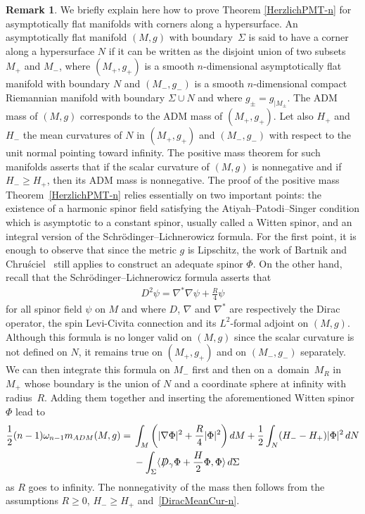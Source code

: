 \documentclass[10pt,a4paper]{article}
\numberwithin{equation}{section}
\theoremstyle{definition}
\newtheorem{Remark}[Theorem]{Remark}
\def\D{D\!\!\!\!/\,}
\begin{document}
\begin{Remark}\label{SpinBoundaryCorner}
We briefly explain here how to prove Theorem \ref{HerzlichPMT-n} for asymptotically flat manifolds with corners along a hypersurface. An asymptotically flat manifold $(M,g)$ with boundary~$\Sigma$ is said to have a corner along a hypersurface $N$ if it can be written as the disjoint union of two subsets $M_+$ and $M_-$, where $(M_+,g_{+})$ is a smooth $n$-dimensional asymptotically flat manifold with boundary $N$ and $(M_-,g_-)$ is a smooth $n$-dimensional compact Riemannian manifold with boundary $\Sigma\cup N$ and where $g_\pm=g_{|M_\pm}$. The ADM mass of $(M,g)$ corresponds to the ADM mass of $(M_+,g_+)$. Let also $H_+$ and $H_-$ the mean curvatures of $N$ in $(M_+,g_+)$ and $(M_-,g_-)$ with respect to the unit normal pointing toward infinity. The positive mass theorem for such manifolds asserts that if the scalar curvature of $(M,g)$ is nonnegative and if $H_-\geq H_+$, then its ADM mass is nonnegative. The proof of the positive mass Theorem~\ref{HerzlichPMT-n} relies essentially on two important points: the existence of a harmonic spinor field satisfying the Atiyah--Patodi--Singer condition which is asymptotic to a constant spinor, usually called a Witten spinor, and an integral version of the Schr\"odinger--Lichnerowicz formula. For the first point, it is enough to observe that since the metric $g$ is Lipschitz, the work of Bartnik and Chru\'sciel~\cite{BartnikChrusciel} still applies to construct an adequate spinor $\Phi$. On the other hand, recall that the Schr\"odinger--Lichnerowicz formula asserts that
\begin{gather*}%
D^2\psi=\nabla^*\nabla\psi+\frac{R}{4}\psi
\end{gather*}
for all spinor field $\psi$ on $M$ and where $D$, $\nabla$ and $\nabla^\ast$ are respectively the Dirac operator, the spin Levi-Civita connection and its $L^2$-formal adjoint on $(M,g)$. Although this formula is no longer valid on $(M,g)$ since the scalar curvature is not defined on $N$, it remains true on $(M_+,g_+)$ and on $(M_-,g_-)$ separately. We can then integrate this formula on $M_-$ first and then on a~domain~$M_R$ in~$M_+$ whose boundary is the union of $N$ and a coordinate sphere at infinity with radius~$R$. Adding them together and inserting the aforementioned Witten spinor $\Phi$ lead to
\begin{align*}
\frac{1}{2}(n-1)\omega_{n-1}m_{\rm ADM}(M,g) ={} & \int_{M}\bigg(|\nabla\Phi|^2+\frac{R}{4}|\Phi|^2\bigg)\,{\rm d}M+\frac{1}{2}\int_N(H_--H_+)|\Phi|^2\,{\rm d}N
\\
& -\int_{\Sigma}\langle \D_\gamma\Phi+\frac{H}{2}\Phi,\Phi\rangle \,{\rm d}\Sigma
\end{align*}
as $R$ goes to infinity. The nonnegativity of the mass then follows from the assumptions $R\geq 0$, $H_-\geq H_+$ and~\eqref{DiracMeanCur-n}.
\end{Remark}
\end{document}
